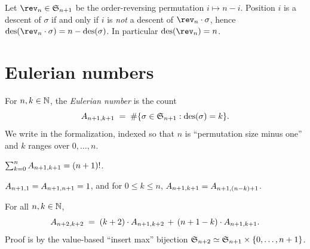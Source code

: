 \begin{lemma}
  \label{lem:des_rev_perm}
  \rocqok
  Let $\rev_n \in \Snp{n+1}$ be the order-reversing permutation
  $i \mapsto n - i$.  Position $i$ is a descent of $\sigma$ if and only
  if $i$ is \emph{not} a descent of $\rev_n \cdot \sigma$, hence
  $\des(\rev_n \cdot \sigma) = n - \des(\sigma)$.  In particular
  $\des(\rev_n) = n$.
\end{lemma}

\section{Eulerian numbers}

\begin{definition}
  \label{def:eulerian}
  \rocqok
  For $n, k \in \mathbb{N}$, the \emph{Eulerian number} is the count
  \[
    A_{n+1,k+1}
    \;=\;
    \#\{\sigma \in \mathfrak{S}_{n+1} : \operatorname{des}(\sigma) = k\}.
  \]
  We write  in the formalization, indexed so that
  $n$ is ``permutation size minus one'' and $k$ ranges over $0, \dots, n$.
\end{definition}

\begin{lemma}
  \label{lem:eulerian_row_sum_fact}
  \rocqok
  $\sum_{k=0}^{n} A_{n+1,k+1} = (n+1)!$.
\end{lemma}

\begin{lemma}
  \label{lem:eulerian_boundary}
  \rocqok
  $A_{n+1,1} = A_{n+1,n+1} = 1$, and for $0 \leq k \leq n$,
  $A_{n+1,k+1} = A_{n+1,(n-k)+1}$.
\end{lemma}

\begin{theorem}
  \label{thm:eulerian_rec}
  \rocqok
  For all $n, k \in \mathbb{N}$,
  \[
    A_{n+2,k+2}
    \;=\;
    (k+2) \cdot A_{n+1,k+2}
    \,+\,
    (n+1-k) \cdot A_{n+1,k+1}.
  \]
  Proof is by the value-based ``insert max'' bijection
  $\mathfrak{S}_{n+2} \simeq \mathfrak{S}_{n+1} \times \{0, \dots, n+1\}$.
\end{theorem}

